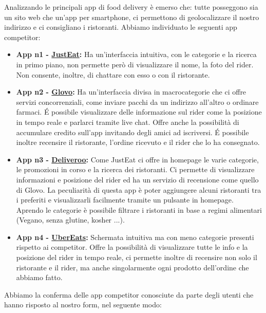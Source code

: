 \documentclass{article}
\begin{document}
     \par
    \vspace{0.5cm}
    Analizzando le principali app di food delivery è emerso che: tutte posseggono sia un sito web che un'app per smartphone, ci permettono di geolocalizzare il nostro indirizzo e ci consigliano i ristoranti.
    Abbiamo individuato le seguenti app competitor:
\begin{itemize}
        \item \textbf{App n1 - \href{https://www.justeat.it}{JustEat}:} Ha un’interfaccia intuitiva, con le categorie e la ricerca in primo piano, non permette però di visualizzare il nome, la foto del rider. Non consente, inoltre, di chattare con esso o con il ristorante.

        \item \textbf{App n2 - \href{https://glovoapp.com/it/it/}{Glovo}:} Ha un'interfaccia divisa in macrocategorie che ci offre servizi concorrenziali, come inviare pacchi da un indirizzo all’altro o ordinare farmaci. É possibile visualizzare delle informazione sul rider come la posizione in tempo reale e parlarci tramite live chat. Offre anche la possibilità di accumulare credito sull’app invitando degli amici ad iscriversi. É possibile inoltre recensire il ristorante, l’ordine ricevuto e il rider che lo ha consegnato.

        \item \textbf{App n3 - \href{https://deliveroo.it/it/}{Deliveroo}:} Come JustEat ci offre in homepage le varie categorie, le promozioni in corso e la ricerca dei ristoranti. Ci permette di visualizzare informazioni e posizione del rider ed ha un servizio di recensione come quello di Glovo. La peculiarità di questa app è poter aggiungere alcuni ristoranti tra i preferiti e visualizzarli facilmente tramite un pulsante in homepage. Aprendo le categorie è possibile filtrare i ristoranti in base a regimi alimentari (Vegano, senza glutine, kosher ...).

        \item \textbf{App n4 - \href{https://www.ubereats.com/it}{UberEats}:} Schermata intuitiva ma con meno categorie presenti rispetto ai competitor. Offre la possibilità di visualizzare tutte le info e la posizione del rider in tempo reale, ci permette inoltre di recensire non solo il ristorante e il rider, ma anche singolarmente ogni prodotto dell’ordine che abbiamo fatto.

    

\end{itemize}Abbiamo la conferma delle app competitor conosciute da parte degli utenti che hanno risposto al nostro form, nel seguente modo:
\end{document}

